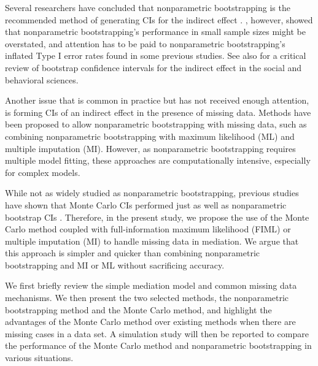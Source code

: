 \documentclass[man]{apa7}\usepackage[]{graphicx}\usepackage[]{xcolor}
\begin{document}
Several researchers have concluded that nonparametric bootstrapping
is the recommended method of generating CIs for the indirect effect
\parencite[e.g.,][]{Lib-Mediation-Bootstrap-Shrout-2002,
Lib-Mediation-Monte-Carlo-Method-MacKinnon-2004,
Lib-Mediation-Bootstrap-Preacher-2008,
Lib-Mediation-Bootstrap-Cheung-2007-07,
Lib-Mediation-Bootstrap-Taylor-2007,
Lib-Mediation-Profile-Likelihood-Cheung-2009a,
Lib-Mediation-Bootstrap-Biesanz-2010}.
\Textcite{Lib-Mediation-Bootstrap-Koopman-2015},
however,
showed that nonparametric bootstrapping's performance in small sample sizes 
might be overstated,
and attention has to be paid to nonparametric bootstrapping's
inflated Type I error rates found in some previous studies.
See also 
\Textcite{Lib-Mediation-Bootstrap-Koopman-2014}
for a critical review of bootstrap confidence intervals for the indirect effect
in the social and behavioral sciences.

Another issue that is common in practice but has not received enough attention,
is forming CIs of an indirect effect in the presence of missing data.
Methods have been proposed to allow nonparametric bootstrapping
with missing data,
such as combining nonparametric bootstrapping with maximum likelihood (ML)
and multiple imputation (MI).
However,
as nonparametric bootstrapping requires multiple model fitting,
these approaches are computationally intensive,
especially for complex models.

While not as widely studied as nonparametric bootstrapping,
previous studies have shown that Monte Carlo CIs performed
just as well as nonparametric bootstrap CIs
\parencite[see][]{Lib-Mediation-Monte-Carlo-Method-MacKinnon-2004,
Lib-Mediation-Monte-Carlo-Method-Preacher-2012,
Lib-Mediation-Monte-Carlo-Method-Tofighi-2015}.
Therefore,
in the present study,
we propose the use of the Monte Carlo method coupled
with full-information maximum likelihood (FIML) or multiple imputation (MI)
to handle missing data in mediation.
We argue that this approach is simpler and quicker
than combining nonparametric bootstrapping and MI or ML
without sacrificing accuracy.

We first briefly review the simple mediation model
and common missing data mechanisms.
We then present the two selected methods,
the nonparametric bootstrapping method and the Monte Carlo method,
and highlight the advantages of the Monte Carlo method over existing methods
when there are missing cases in a data set.
A simulation study will then be reported to compare the performance
of the Monte Carlo method and nonparametric bootstrapping in various situations.
\end{document}

